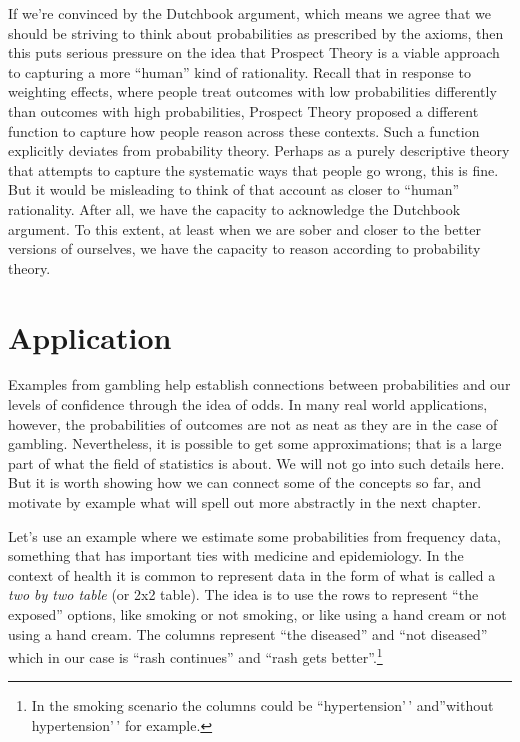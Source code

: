 \documentclass[]{tufte-book}
\begin{document}
If we're convinced by the Dutchbook argument, which means we agree that we should be striving to think about probabilities as prescribed by the axioms, then this puts serious pressure on the idea that Prospect Theory is a viable approach to capturing a more ``human'' kind of rationality. Recall that in response to weighting effects, where people treat outcomes with low probabilities differently than outcomes with high probabilities, Prospect Theory proposed a different function to capture how people reason across these contexts. Such a function explicitly deviates from probability theory. Perhaps as a purely descriptive theory that attempts to capture the systematic ways that people go wrong, this is fine. But it would be misleading to think of that account as closer to ``human'' rationality. After all, we have the capacity to acknowledge the Dutchbook argument. To this extent, at least when we are sober and closer to the better versions of ourselves, we have the capacity to reason according to probability theory.

\hypertarget{application}{%
\section{Application}\label{application}}

Examples from gambling help establish connections between probabilities and our levels of confidence through the idea of odds. In many real world applications, however, the probabilities of outcomes are not as neat as they are in the case of gambling. Nevertheless, it is possible to get some approximations; that is a large part of what the field of statistics is about. We will not go into such details here. But it is worth showing how we can connect some of the concepts so far, and motivate by example what will spell out more abstractly in the next chapter.

Let's use an example where we estimate some probabilities from frequency data, something that has important ties with medicine and epidemiology. In the context of health it is common to represent data in the form of what is called a \emph{two by two table} (or 2x2 table). The idea is to use the rows to represent ``the exposed'' options, like smoking or not smoking, or like using a hand cream or not using a hand cream. The columns represent ``the diseased'' and ``not diseased'' which in our case is ``rash continues'' and ``rash gets better''.\footnote{In the smoking scenario the columns could be ``hypertension'\,' and''without hypertension'\,' for example.}
\end{document}

